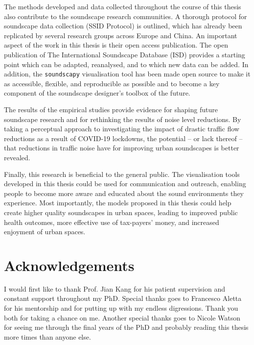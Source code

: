 \documentclass[oneside,fontsize=11pt,titlepage,chapterprefix=true
]{scrbook}
\begin{document}
The methods developed and data collected throughout the course of this thesis also contribute to the soundscape research communities. A thorough protocol for soundscape data collection (SSID Protocol) is outlined, which has already been replicated by several research groups across Europe and China. An important aspect of the work in this thesis is their open access publication. The open publication of The International Soundscape Database (ISD) provides a starting point which can be adapted, reanalysed, and to which new data can be added. In addition, the \texttt{soundscapy} visualisation tool has been made open source to make it as accessible, flexible, and reproducible as possible and to become a key component of the soundscape  designer's toolbox of the future. 

The results of the empirical studies provide evidence for shaping future soundscape research and for rethinking the results of noise level reductions. By taking a perceptual approach to investigating the impact of drastic traffic flow reductions as a result of COVID-19 lockdowns, the potential -- or lack thereof -- that reductions in traffic noise have for improving urban soundscapes is better revealed. 

Finally, this research is beneficial to the general public. The visualisation tools developed in this thesis could be used for communication and outreach, enabling people to become more aware and educated about the sound environments they experience. Most importantly, the models proposed in this thesis could help create higher quality soundscapes in urban spaces, leading to improved public health outcomes, more effective use of tax-payers' money, and increased enjoyment of urban spaces. 


\chapter*{Acknowledgements}

I would first like to thank Prof. Jian Kang for his patient supervision and constant support throughout my PhD. Special thanks goes to Francesco Aletta for his mentorship and for putting up with my endless digressions. Thank you both for taking a chance on me. Another special thanks goes to Nicole Watson for seeing me through the final years of the PhD and probably reading this thesis more times than anyone else. 
\end{document}
